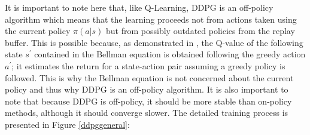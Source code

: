 It is important to note here that, like Q-Learning, DDPG is an off-policy algorithm which means that the learning proceeds not from actions taken using the current policy $ \pi(a|s)$ but from possibly outdated policies from the replay buffer. This is possible because, as demonstrated in \cite{watkins1989}, the Q-value of the following state $s^{'}$ contained in the Bellman equation is obtained following the greedy action $a^{'}$; it estimates the return for a state-action pair assuming a greedy policy is followed. This is why the Bellman equation is not concerned about the current policy and thus why DDPG is an off-policy algorithm. It is also important to note that because DDPG is off-policy, it should be more stable than on-policy methods, although it should converge slower.
\newline
The detailed training process is presented in Figure \ref{ddpggeneral}: \newline

